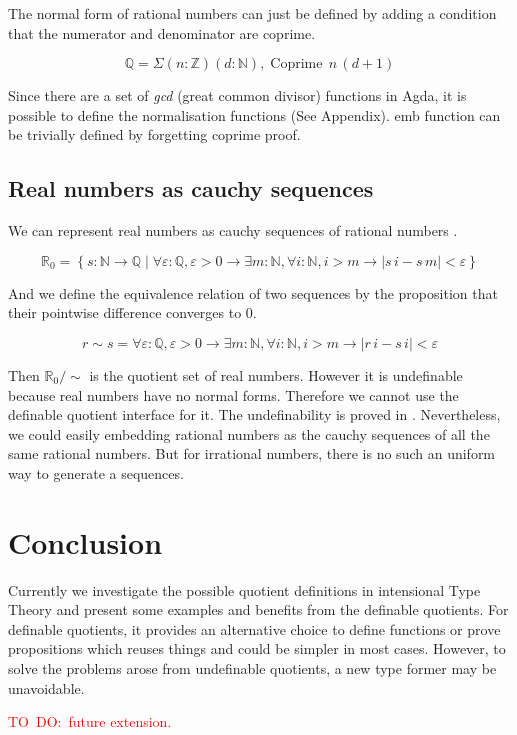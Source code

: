 \documentclass[envcountsame]{llncs}
\newcommand{\todo}[1]{\textcolor{red}{TO~DO:~#1}}
\newcommand{\N}{\mathbb{N}}
\newcommand{\Q}{\mathbb{Q}}
\newcommand{\R}{\mathbb{R}}
\newcommand{\Z}{\mathbb{Z}}
\providecommand{\set}  [1]{\left\{#1\right\}}
\DeclareMathOperator{\coprime}{Coprime}
\newcommand{\itt}{intensional Type Theory}
\begin{document}
The normal form of rational numbers can just be defined by adding a condition that the numerator and denominator are coprime.

$$\Q = \Sigma (n \colon \Z)(d \colon \N), \coprime \,n \,(d +1)$$

Since there are a set of \emph{gcd} (great common divisor) functions in Agda, it is possible to define the normalisation functions (See Appendix).
emb function can be trivially defined by forgetting coprime proof.

\subsection{Real numbers as cauchy sequences}

We can represent real numbers as cauchy sequences of rational numbers \cite{bis:85}.

$$\R_{0} = \set{s : \N\to\Q \mid \forall\varepsilon :\Q,\varepsilon>0\to\exists m:\N, \forall i:\N, i>m\to |s\,i - s\, m|<\varepsilon}$$

And we define the equivalence relation of two sequences by the proposition that their pointwise difference converges to 0.

$$r \sim s = \forall\varepsilon :\Q,\varepsilon>0\to\exists m:\N, \forall i:\N, i>m\to |r\,i - s\,i|<\varepsilon$$

Then $\R_0 /\sim$ is the quotient set of real numbers. However it is undefinable because real numbers have no normal forms.
Therefore we cannot use the definable quotient interface for it. The undefinability is proved in \cite{aan}.
Nevertheless, we could easily embedding rational numbers as the cauchy
sequences of all the same rational numbers. But for irrational
numbers, there is no such an uniform way to generate a sequences.


\section{Conclusion}

Currently we investigate the possible quotient definitions in \itt{} and present some examples and benefits from the definable quotients. For definable quotients, it provides an alternative choice to define functions or prove propositions which reuses things and could be simpler in most cases. However, to solve the problems arose from undefinable quotients, a new type former may be unavoidable.

\todo{future extension.}
\end{document}
